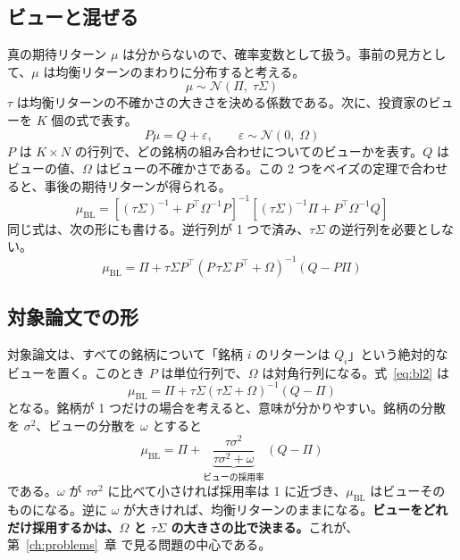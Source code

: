 \documentclass[xelatex,ja=standard,jafont=hiragino-pron,a4paper,10pt]{bxjsreport}
\newcommand{\chapref}[1]{第~\ref{#1}~章}
\begin{document}
\subsection{ビューと混ぜる}

真の期待リターン $\mu$ は分からないので、確率変数として扱う。事前の見方として、$\mu$ は均衡リターンのまわりに分布すると考える。
\begin{equation}
\mu \sim \mathcal{N}(\Pi,\; \tau\Sigma)
\end{equation}
$\tau$ は均衡リターンの不確かさの大きさを決める係数である。次に、投資家のビューを $K$ 個の式で表す。
\begin{equation}
P\mu = Q + \varepsilon,\qquad \varepsilon \sim \mathcal{N}(0,\; \Omega)
\end{equation}
$P$ は $K \times N$ の行列で、どの銘柄の組み合わせについてのビューかを表す。$Q$ はビューの値、$\Omega$ はビューの不確かさである。この 2 つをベイズの定理で合わせると、事後の期待リターンが得られる。
\begin{equation}
\mu_{\mathrm{BL}} = \left[(\tau\Sigma)^{-1} + P^\top \Omega^{-1} P\right]^{-1}
\left[(\tau\Sigma)^{-1}\Pi + P^\top \Omega^{-1} Q\right]
\label{eq:bl1}
\end{equation}
同じ式は、次の形にも書ける。逆行列が 1 つで済み、$\tau\Sigma$ の逆行列を必要としない。
\begin{equation}
\mu_{\mathrm{BL}} = \Pi + \tau\Sigma P^\top \left(P\,\tau\Sigma\,P^\top + \Omega\right)^{-1}\left(Q - P\Pi\right)
\label{eq:bl2}
\end{equation}

\subsection{対象論文での形}

対象論文は、すべての銘柄について「銘柄 $i$ のリターンは $Q_i$」という絶対的なビューを置く。このとき $P$ は単位行列で、$\Omega$ は対角行列になる。式~\eqref{eq:bl2} は
\begin{equation}
\mu_{\mathrm{BL}} = \Pi + \tau\Sigma\left(\tau\Sigma + \Omega\right)^{-1}\left(Q - \Pi\right)
\label{eq:bl3}
\end{equation}
となる。銘柄が 1 つだけの場合を考えると、意味が分かりやすい。銘柄の分散を $\sigma^2$、ビューの分散を $\omega$ とすると
\begin{equation}
\mu_{\mathrm{BL}} = \Pi + \underbrace{\frac{\tau\sigma^2}{\tau\sigma^2 + \omega}}_{\text{ビューの採用率}}\,(Q - \Pi)
\label{eq:scalar}
\end{equation}
である。$\omega$ が $\tau\sigma^2$ に比べて小さければ採用率は 1 に近づき、$\mu_{\mathrm{BL}}$ はビューそのものになる。逆に $\omega$ が大きければ、均衡リターンのままになる。\textbf{ビューをどれだけ採用するかは、$\Omega$ と $\tau\Sigma$ の大きさの比で決まる。}これが、\chapref{ch:problems} で見る問題の中心である。
\end{document}

